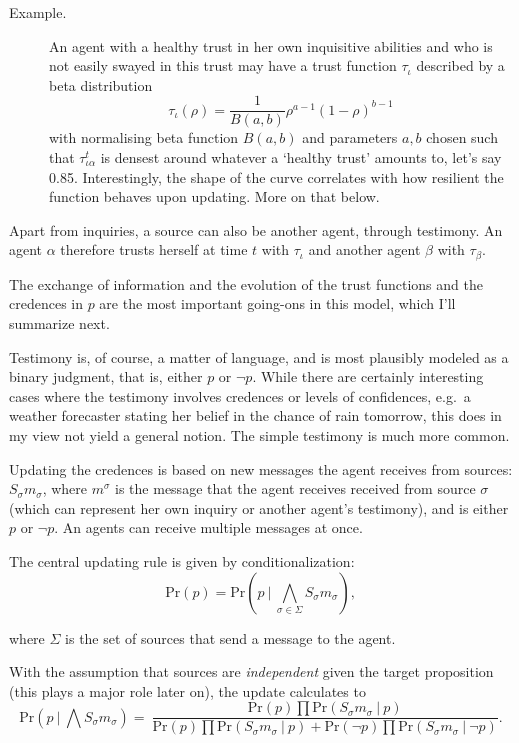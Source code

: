 \documentclass[11pt, a4paper]{scrartcl}
\newcommand{\Ss}{S_{\sigma}}
\newcommand{\given}[1][]{\:#1\vert\:}
\newcommand{\Sm}{\Ss{}m_\sigma}
\renewcommand{\Pr}{\text{Pr}}
\renewcommand{\i}[1]{\emph{#1}}
\begin{document}
\begin{description}
    \item[Example.] An agent with a healthy trust in her own inquisitive abilities and who is not easily swayed in this trust may have a trust function $\tau_{\iota}$ described by a beta distribution
\[
    \tau_{\iota} (\rho) = \frac{1}{B(a,b)} \rho^{a - 1} {(1 - \rho)}^{b-1}
\]
with normalising beta function $B(a,b)$ and parameters $a, b$ chosen such that $\tau^t_{\iota\alpha}$ is densest around whatever a `healthy trust' amounts to, let's say 0.85. Interestingly, the shape of the curve correlates with how resilient the function behaves upon updating. More on that below.
\end{description}
Apart from inquiries, a source can also be another agent, through testimony. An agent $\alpha$ therefore trusts herself at time $t$ with $\tau_{\iota}$ and another agent $\beta$ with $\tau_{\beta}$.

The exchange of information and the evolution of the trust functions and the credences in $p$ are the most important going-ons in this model, which I'll summarize next.

Testimony is, of course, a matter of language, and is most plausibly modeled as a binary judgment, that is, either $p$ or $\neg p$. While there are certainly interesting cases where the testimony involves credences or levels of confidences, e.g.\ a weather forecaster stating her belief in the chance of rain tomorrow, this does in my view not yield a general notion. The simple testimony is much more common. 

Updating the credences is based on new messages the agent receives from sources: $\Sm$, where $m^\sigma$ is the message that the agent receives received from source $\sigma$ (which can represent her own inquiry or another agent's testimony), and is either $p$ or $\neg p$. An agents can receive multiple messages at once.

The central updating rule is given by conditionalization:
\[
    \Pr(p) = \Pr (p \given \bigwedge_{\sigma \in \Sigma} \Sm),
\]

where $\Sigma$ is the set of sources that send a message to the agent.

With the assumption that sources are \i{independent} given the target proposition (this plays a major role later on), the update calculates to
\begin{equation}
    \label{eq:upd}
    \Pr (p \given \bigwedge \Sm) = \
     \frac{\Pr (p) \prod \Pr (\Sm \given p) }
    {\Pr(p) \prod \Pr (\Sm \given p) +  \Pr (\neg p) \prod \Pr (\Sm \given \neg p) }.
\end{equation}
\end{document}
